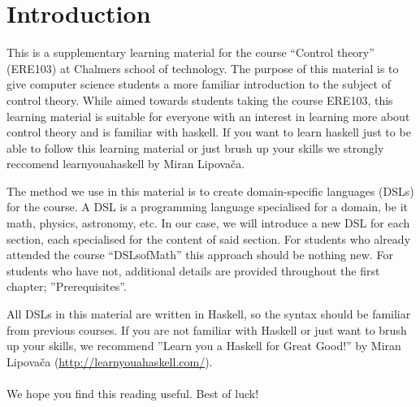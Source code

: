 \section{Introduction}

This is a supplementary learning material for the course ``Control theory'' (ERE103) at Chalmers school of technology. The purpose of this material is to give computer science students a more familiar introduction to the subject of control theory. While aimed towards students taking the course ERE103, this learning material is suitable for everyone with an interest in learning more about control theory and is familiar with haskell. If you want to learn haskell just to be able to follow this learning material or just brush up your skills we strongly reccomend learnyouahaskell by Miran Lipovača. 

The method we use in this material is to create domain-specific languages (DSLs) for the course. A DSL is a programming language specialised for a domain, be it math, physics, astronomy, etc. In our case, we will introduce a new DSL for each section, each specialised for the content of said section. For students who already attended the course ``DSLsofMath'' this approach should be nothing new. For students who have not, additional details are provided throughout the first chapter; ''Prerequisites''.

All DSLs in this material are written in Haskell, so the syntax should be familiar from previous courses. If you are not familiar with Haskell or just want to brush up your skills, we recommend ''Learn you a Haskell for Great Good!'' by Miran Lipovača (\href{http://learnyouahaskell.com/}{http://learnyouahaskell.com/}). 

\paragraph{} We hope you find this reading useful. Best of luck!
